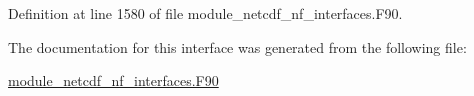 Definition at line 1580 of file module\+\_\+netcdf\+\_\+nf\+\_\+interfaces.\+F90.



The documentation for this interface was generated from the following file\+:\begin{DoxyCompactItemize}
\item 
\hyperlink{module__netcdf__nf__interfaces_8F90}{module\+\_\+netcdf\+\_\+nf\+\_\+interfaces.\+F90}\end{DoxyCompactItemize}
